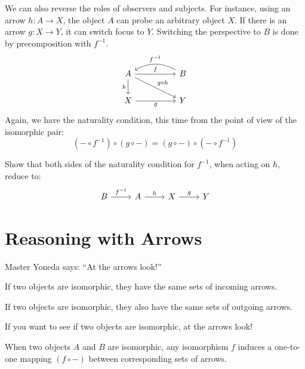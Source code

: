 \documentclass[DaoFP]{subfiles}
\begin{document}
We can also reverse the roles of observers and subjects. For instance, using an arrow $h \colon A \to X$, the object $A$ can probe an arbitrary object $X$. If there is an arrow $g \colon X \to Y$, it can switch focus to $Y$. Switching the perspective to $B$ is done by precomposition with $f^{-1}$.
\[
 \begin{tikzcd}
 A
 \arrow[rr, "f"]
 \arrow[d, "h"']
 \arrow[rrd, "g\circ h"]
 && B
  \arrow[ll, bend right,  "f^{-1}"']
 \\
 X
 \arrow[rr, "g"']
  && Y
 \end{tikzcd}
\]
Again, we have the naturality condition, this time from the point of view of the isomorphic pair:
\[(- \circ f^{-1}) \circ (g \circ -) = (g \circ -) \circ (- \circ f^{-1}) \]

\begin{exercise}
Show that both sides of the naturality condition for $f^{-1}$, when acting on $h$, reduce to:
\[
 \begin{tikzcd}
 B \arrow[r, "f^{-1}"] &A \arrow[r, "h"] & X \arrow[r, "g"] & Y
\end{tikzcd}
\]

\end{exercise}

\section{Reasoning with Arrows}

Master Yoneda says: ``At the arrows look!''

If two objects are isomorphic, they have the same sets of incoming arrows. 

If two objects are isomorphic, they also have the same sets of outgoing arrows.

If you want to see if two objects are isomorphic, at the arrows look!

\medskip

When two objects $A$ and $B$ are isomorphic, any isomorphism $f$ induces a one-to-one mapping $(f \circ -)$ between corresponding sets of arrows.  
\end{document}
